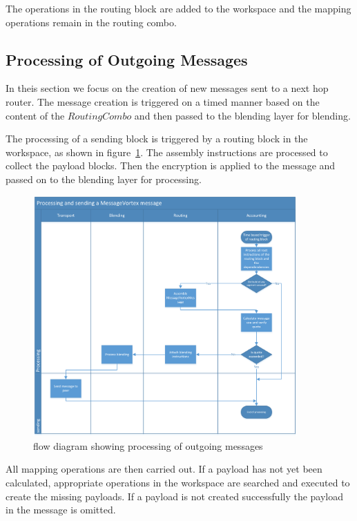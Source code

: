 The operations in the routing block are added to the workspace and the mapping operations remain in the routing combo. 

\subsection{Processing of Outgoing Messages\label{sec:processingOutgoingMessages}}
In theis section we focus on the creation of new messages sent to a next hop router. The message creation is triggered on a timed manner based on the content of the $RoutingCombo$ and then passed to the blending layer for blending.

The processing of a sending block is triggered by a routing block in the workspace, as shown in figure~\ref{fig:msgSendProcessing}. The assembly instructions are processed to collect the payload blocks. Then the encryption is applied to the message and passed on to the blending layer for processing.

\begin{figure}[ht]
	\centering
	\includegraphics[width=0.90\textwidth]{inc/flowchart_message_sending}
	\caption{flow diagram showing processing of outgoing messages}
	\label{fig:msgSendProcessing}
\end{figure}

All mapping operations are then carried out. If a payload has not yet been calculated, appropriate operations in the workspace are searched and executed to create the missing payloads. If a payload is not created successfully the payload in the message is omitted. 

